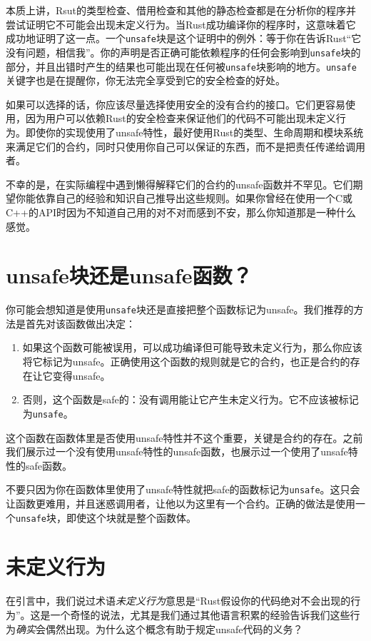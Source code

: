 本质上讲，Rsut的类型检查、借用检查和其他的静态检查都是在分析你的程序并尝试证明它不可能会出现未定义行为。当Rust成功编译你的程序时，这意味着它成功地证明了这一点。一个\texttt{unsafe}块是这个证明中的例外：等于你在告诉Rust“它没有问题，相信我”。你的声明是否正确可能依赖程序的任何会影响到\texttt{unsafe}块的部分，并且出错时产生的结果也可能出现在任何被\texttt{unsafe}块影响的地方。\texttt{unsafe}关键字也是在提醒你，你无法完全享受到它的安全检查的好处。

如果可以选择的话，你应该尽量选择使用安全的没有合约的接口。它们更容易使用，因为用户可以依赖Rust的安全检查来保证他们的代码不可能出现未定义行为。即使你的实现使用了unsafe特性，最好使用Rust的类型、生命周期和模块系统来满足它们的合约，同时只使用你自己可以保证的东西，而不是把责任传递给调用者。

不幸的是，在实际编程中遇到懒得解释它们的合约的unsafe函数并不罕见。它们期望你能依靠自己的经验和知识自己推导出这些规则。如果你曾经在使用一个C或C++的API时因为不知道自己用的对不对而感到不安，那么你知道那是一种什么感觉。

\section{unsafe块还是unsafe函数？}
你可能会想知道是使用\texttt{unsafe}块还是直接把整个函数标记为unsafe。我们推荐的方法是首先对该函数做出决定：
\begin{enumerate}
    \item 如果这个函数可能被误用，可以成功编译但可能导致未定义行为，那么你应该将它标记为unsafe。正确使用这个函数的规则就是它的合约，也正是合约的存在让它变得unsafe。
    \item 否则，这个函数是safe的：没有调用能让它产生未定义行为。它不应该被标记为\texttt{unsafe}。
\end{enumerate}

这个函数在函数体里是否使用unsafe特性并不这个重要，关键是合约的存在。之前我们展示过一个没有使用unsafe特性的unsafe函数，也展示过一个使用了unsafe特性的safe函数。

不要只因为你在函数体里使用了unsafe特性就把safe的函数标记为\texttt{unsafe}。这只会让函数更难用，并且迷惑调用者，让他以为这里有一个合约。正确的做法是使用一个\texttt{unsafe}块，即使这个块就是整个函数体。

\section{未定义行为}
在引言中，我们说过术语\emph{未定义行为}意思是“Rust假设你的代码绝对不会出现的行为”。这是一个奇怪的说法，尤其是我们通过其他语言积累的经验告诉我们这些行为\emph{确实}会偶然出现。为什么这个概念有助于规定unsafe代码的义务？

